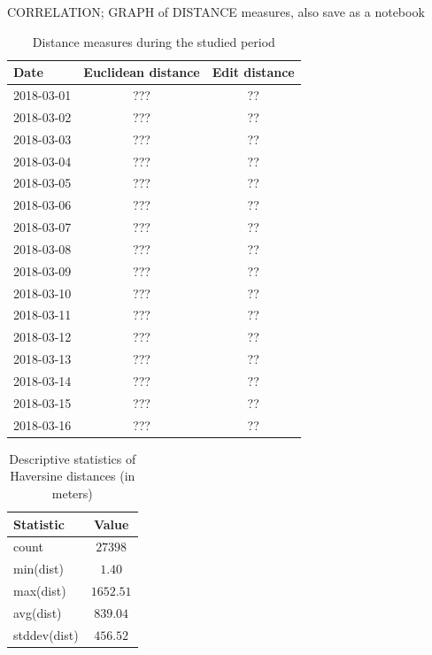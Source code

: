 CORRELATION; GRAPH of DISTANCE measures, also save as a notebook
\begin{table}[h]
    \centering
    \begin{tabular}{|l|c|c|}
        \hline
        \textbf{Date} & \textbf{Euclidean distance} & \textbf{Edit distance}\\
        \hline 
        2018-03-01 & ??? & ?? \\
        \hline 
        2018-03-02 & ??? & ?? \\
        \hline 
        2018-03-03 & ??? & ?? \\
        \hline 
        2018-03-04 & ??? & ?? \\
        \hline 
        2018-03-05 & ??? & ?? \\
        \hline 
        2018-03-06 & ??? & ?? \\
        \hline 
        2018-03-07 & ??? & ?? \\
        \hline 
        2018-03-08 & ??? & ?? \\
        \hline 
        2018-03-09 & ??? & ?? \\
        \hline 
        2018-03-10 & ??? & ?? \\
        \hline 
        2018-03-11 & ??? & ?? \\
        \hline 
        2018-03-12 & ??? & ?? \\
        \hline 
        2018-03-13 & ??? & ?? \\
        \hline 
        2018-03-14 & ??? & ?? \\
        \hline 
        2018-03-15 & ??? & ?? \\
        \hline 
        2018-03-16 & ??? & ?? \\
        \hline
    \end{tabular}
    \caption{Distance measures during the studied period}
    \label{tab:distances}
\end{table}

\begin{table}[h]
    \centering
    \begin{tabular}{|l|c|}
        \hline
        \textbf{Statistic} & \textbf{Value} \\
        \hline 
        count & $27398$ \\
        \hline
        min(dist) &  $1.40$\\
        \hline
        max(dist) &   $1652.51$\\
        \hline
        avg(dist) &  $839.04$\\
        \hline
        stddev(dist) &  $456.52$\\
        \hline
    \end{tabular}
    \caption{Descriptive statistics of Haversine distances (in meters)}
    \label{tab:dist_stats}
\end{table}

